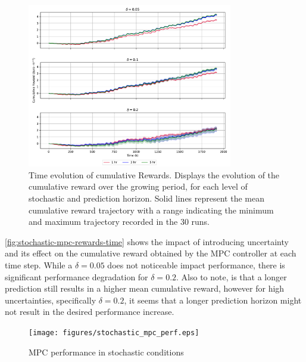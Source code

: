 \begin{figure}[H]
	\centering
	\includegraphics[width=0.8\textwidth]{figures/stochastic_mpc_rewards_time.pdf}
	\caption{Time evolution of cumulative Rewards. Displays the evolution of the cumulative reward over the growing period, for each level of stochastic and prediction horizon. Solid lines represent the mean cumulative reward trajectory with a range indicating the minimum and maximum trajectory recorded in the 30 runs.}
	\label{fig:stochastic-mpc-rewards-time}
\end{figure}

\autoref{fig:stochastic-mpc-rewards-time} shows the impact of introducing uncertainty and its effect on the cumulative reward obtained by the MPC controller at each time step. While a $\delta = 0.05$ does not noticeable impact performance, there is significant performance degradation for $\delta = 0.2$. Also to note, is that a longer prediction still results in a higher mean cumulative reward, however for high uncertainties, specifically $\delta = 0.2$, it seems that a longer prediction horizon might not result in the desired performance increase.

\begin{figure}[H]
	\centering
	\texttt{[image: figures/stochastic\_mpc\_perf.eps]}
	\caption{MPC performance in stochastic conditions }
	\label{fig:stochastic-mpc-perf}
\end{figure}


